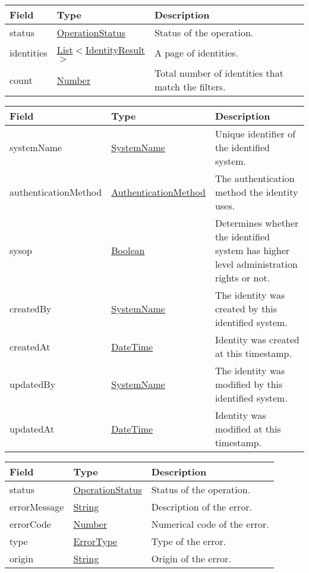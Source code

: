 \documentclass[a4paper]{arrowhead}
\newcommand{\pref}[1]{{\textcolor{ArrowheadGrey}{\hyperref[sec:model:primitives:#1]{#1}}}}
\begin{document}

\begin{table}[ht!]
\begin{tabularx}{\textwidth}{| p{2.5cm} | p{3.2cm} | X |} \hline
\rowcolor{gray!33} Field & Type      & Description \\ \hline
status & \pref{OperationStatus} & Status of the operation. \\ \hline
identities & \pref{List}$<$\hyperref[sec:model:IdentityResult]{IdentityResult}$>$ & A page of identities. \\ \hline
count & \pref{Number} & Total number of identities that match the filters. \\ \hline
\end{tabularx}
\end{table}

 
\begin{table}[ht!]
\begin{tabularx}{\textwidth}{| p{3.3cm} | p{4cm} | X |} \hline
\rowcolor{gray!33} Field & Type      & Description \\ \hline
systemName & \pref{SystemName} & Unique identifier of the identified system. \\ \hline
authenticationMethod & \pref{AuthenticationMethod} & The authentication method the identity uses. \\ \hline
sysop & \pref{Boolean} & Determines whether the identified system has higher level administration rights or not. \\ \hline
createdBy & \pref{SystemName} & The identity was created by this identified system. \\ \hline
createdAt & \pref{DateTime} & Identity was created at this timestamp. \\ \hline
updatedBy & \pref{SystemName} & The identity was modified by this identified system. \\ \hline
updatedAt & \pref{DateTime} & Identity was modified at this timestamp. \\ \hline
\end{tabularx}
\end{table}


\begin{table}[ht!]
\begin{tabularx}{\textwidth}{| p{2.5cm} | p{3cm} | X |} \hline
\rowcolor{gray!33} Field & Type      & Description \\ \hline
status & \pref{OperationStatus} & Status of the operation. \\ \hline
errorMessage & \pref{String} & Description of the error. \\ \hline
errorCode &\pref{Number}  & Numerical code of the error. \\ \hline
type & \pref{ErrorType} & Type of the error. \\ \hline
origin & \pref{String} & Origin of the error. \\ \hline
\end{tabularx}
\end{table}
\end{document}

